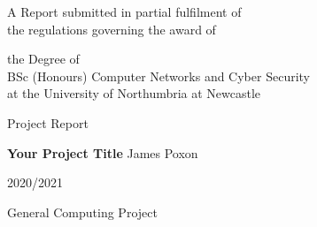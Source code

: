 
\begin{titlepage}
\Large
A Report submitted in partial fulfilment of\\
 the regulations governing the award of
\par
the Degree of\\[5mm]
{\huge	 BSc (Honours) Computer Networks and Cyber Security }\\[5mm]
at the University of Northumbria at Newcastle
\par
\vspace*{1in}
{\Large Project Report}
\par\vspace{1em}
{\Huge \bfseries Your Project Title}
\vfill
James Poxon
\par\vspace{1em}
2020/2021
\par\vspace{1em}
General Computing Project
\end{titlepage}
